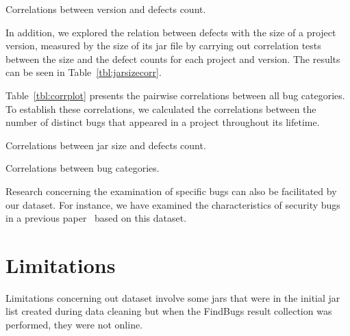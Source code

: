 \documentclass{sig-alternate}
\begin{document}
\begin{table}[b]
    \centering
\scalebox{0.94}{
        
}
	\caption{Correlations between version and defects count.}
    \label{tbl:bugsperversion}
\end{table}

In addition, we explored the relation between defects
with the size of a project
version, measured by the size of its {\sc jar} file by carrying out
correlation tests between the size and the defect counts for each
project and version. The results can be seen in
Table~\ref{tbl:jarsizecorr}.

Table~\ref{tbl:corrplot} presents the pairwise correlations
between all bug categories. To establish these correlations,
we calculated the correlations between the number of
distinct bugs that appeared in a project throughout its lifetime.

\begin{table}[hbt]
    \centering
\scalebox{0.94}{
    
}
    \caption{Correlations between {\sc jar} size and defects count.}
    \label{tbl:jarsizecorr}
\end{table}

\begin{table}[hbt]
    \centering
\scalebox{0.86}{
    
}
    \caption{Correlations between bug categories.}
    \label{tbl:corrplot}
\end{table}


Research concerning the examination of specific bugs
can also be facilitated by our dataset. For instance,
we have examined the characteristics of security
bugs in a previous paper~\cite{MKLGS13}
based on this dataset.

\section{Limitations}
\label{sec:limit}

Limitations concerning out dataset involve some
{\sc jar}s that were in the initial {\sc jar} list
created during data cleaning but when the
FindBugs result collection was performed, they
were not online.
\end{document}
